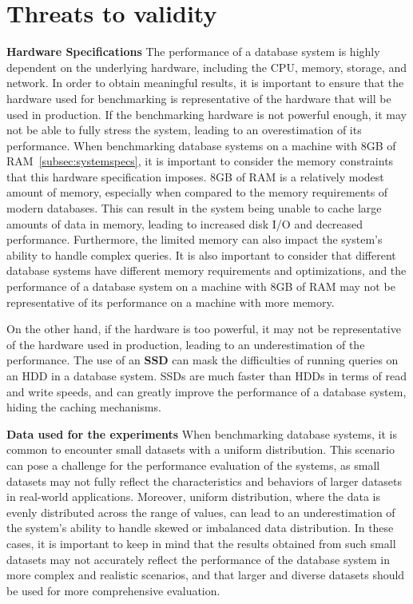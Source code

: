 \section{Threats to validity }
\label{sec:threats}

\par{\textbf{Hardware Specifications}}
The performance of a database system is highly dependent on the underlying hardware, 
including the CPU, memory, storage, and network. In order to obtain meaningful results, 
it is important to ensure that the hardware used for benchmarking is representative 
of the hardware that will be used in production. 
If the benchmarking hardware is not powerful enough, 
it may not be able to fully stress the system, leading to an overestimation of its performance. 
When benchmarking database systems on a machine with 8GB of RAM~\ref{subsec:systemspecs},
it is important to consider the memory constraints that this hardware specification imposes. 
8GB of RAM is a relatively modest amount of memory, especially when compared to the memory 
requirements of modern databases. This can result in the system being unable to cache large amounts 
of data in memory, leading to increased disk I/O and decreased performance. 
Furthermore, the limited memory can also impact the system's ability to handle complex queries.
It is also important to consider that different database systems have different memory 
requirements and optimizations, 
and the performance of a database system on a machine with 8GB of RAM may not be representative 
of its performance on a machine with more memory. 

On the other hand, if the hardware is too powerful, it may not be representative of the hardware 
used in production, leading to an underestimation of the performance.
The use of an \textbf{SSD} can mask the difficulties of running queries on an HDD in a database system. 
SSDs are much faster than HDDs in terms of read and write speeds, and can greatly improve 
the performance of a database system, hiding the caching mechanisms. 

\par{\textbf{Data used for the experiments}}
When benchmarking database systems, it is common to encounter small datasets with a uniform distribution. 
This scenario can pose a challenge for the performance evaluation of the systems, 
as small datasets may not fully reflect the characteristics and behaviors of larger datasets 
in real-world applications. Moreover, uniform distribution, 
where the data is evenly distributed across the range of values, can lead to an underestimation of 
the system's ability to handle skewed or imbalanced data distribution. 
In these cases, it is important to keep in mind that the results obtained 
from such small datasets may not accurately reflect the performance 
of the database system in more complex and realistic scenarios, 
and that larger and diverse datasets should be used for more comprehensive evaluation.


